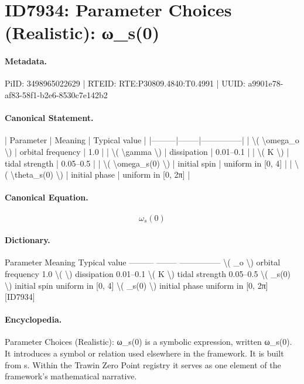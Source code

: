 \section*{ID7934: Parameter Choices (Realistic): ω\_s(0)}
\paragraph{Metadata.}
PiID: 3498965022629 | RTEID: RTE:P30809.4840:T0.4991 | UUID: a9901e78-af83-58f1-b2e6-8530c7e142b2

\paragraph{Canonical Statement.}
| Parameter | Meaning | Typical value | |---------|--------|---------------| | \textbackslash{}( \textbackslash{}omega\_o \textbackslash{}) | orbital frequency | 1.0 | | \textbackslash{}( \textbackslash{}gamma \textbackslash{}) | dissipation | 0.01–0.1 | | \textbackslash{}( K \textbackslash{}) | tidal strength | 0.05–0.5 | | \textbackslash{}( \textbackslash{}omega\_s(0) \textbackslash{}) | initial spin | uniform in [0, 4] | | \textbackslash{}( \textbackslash{}theta\_s(0) \textbackslash{}) | initial phase | uniform in [0, 2π] |

\paragraph{Canonical Equation.}
\[
\omega_s(0)
\]

\paragraph{Dictionary.}
Parameter Meaning Typical value --------- -------- --------------- \textbackslash{}( \_o \textbackslash{}) orbital frequency 1.0 \textbackslash{}( \textbackslash{}) dissipation 0.01–0.1 \textbackslash{}( K \textbackslash{}) tidal strength 0.05–0.5 \textbackslash{}( \_s(0) \textbackslash{}) initial spin uniform in [0, 4] \textbackslash{}( \_s(0) \textbackslash{}) initial phase uniform in [0, 2π] [ID7934]

\paragraph{Encyclopedia.}
Parameter Choices (Realistic): ω\_s(0) is a symbolic expression, written ω\_s(0). It introduces a symbol or relation used elsewhere in the framework. It is built from s. Within the Trawin Zero Point registry it serves as one element of the framework's mathematical narrative.

